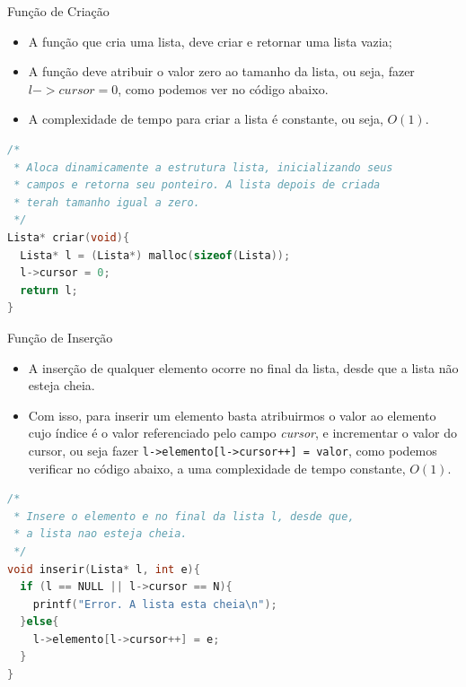 \begin{frame}[fragile,c]{Função de Criação}
	\begin{itemize}
	\item A função que cria uma lista, deve criar e retornar uma lista vazia;
	\item A função deve atribuir o valor zero ao tamanho da lista, ou seja, fazer $l->cursor = 0$, como podemos ver no código abaixo.
	\item A complexidade de tempo para criar a lista é constante, ou seja, $O(1)$.
	\end{itemize}
	
\begin{lstlisting}[language=C]
/*
 * Aloca dinamicamente a estrutura lista, inicializando seus
 * campos e retorna seu ponteiro. A lista depois de criada
 * terah tamanho igual a zero.
 */
Lista* criar(void){
  Lista* l = (Lista*) malloc(sizeof(Lista));
  l->cursor = 0;
  return l;
}
\end{lstlisting}
\end{frame}

\begin{frame}[fragile,c]{Função de Inserção}  
	\begin{itemize}
	\item A inserção de qualquer elemento ocorre no final da lista, desde que a lista não esteja cheia.
	\item Com isso, para inserir um elemento basta atribuirmos o valor ao elemento cujo índice é o valor referenciado pelo campo \textit{cursor}, e incrementar o valor do cursor, ou seja fazer 
	\texttt{l->elemento[l->cursor++] = valor}, como podemos verificar no código abaixo, a uma complexidade de tempo constante, $O(1)$.
	\end{itemize}

\footnotesize
\begin{lstlisting}[language=C]
/*
 * Insere o elemento e no final da lista l, desde que,
 * a lista nao esteja cheia.
 */
void inserir(Lista* l, int e){
  if (l == NULL || l->cursor == N){
    printf("Error. A lista esta cheia\n");
  }else{
    l->elemento[l->cursor++] = e;
  }
}
\end{lstlisting}	
\end{frame}

